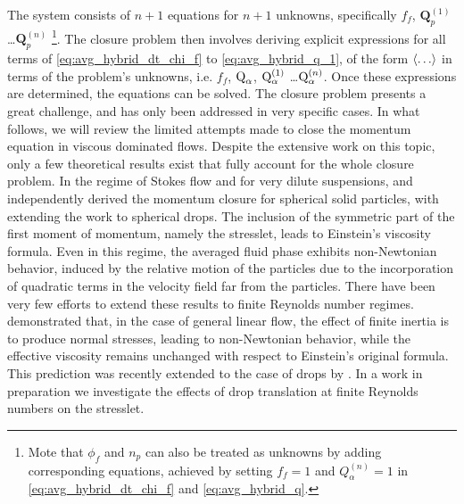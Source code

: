 The system consists of $n+1$ equations for $n+1$ unknowns, specifically $f_f$, $\textbf{Q}_p^{(1)}$\ldots$\textbf{Q}_p^{(n)}$ \footnote{Mote that $\phi_f$ and $n_p$ can also be treated as unknowns by adding corresponding equations, achieved by setting $f_f=1$ and $Q_\alpha^{(n)} =1$ in \ref{eq:avg_hybrid_dt_chi_f} and \ref{eq:avg_hybrid_q}.}.
 The closure problem then involves deriving explicit expressions for all terms of \ref{eq:avg_hybrid_dt_chi_f} to \ref{eq:avg_hybrid_q_1}, of the form $\left<\ldots\right>$ in terms of the problem's unknowns, i.e. 
 $f_f$, $\text Q_\alpha$, $\text Q_\alpha^{(1)}$ \ldots $ \text Q_\alpha^{(n)}$.  
 Once these expressions are determined, the equations can be solved. 
 The closure problem presents a great challenge, and has only been addressed in very specific cases. 
 In what follows, we will review the limited attempts made to close the momentum equation in viscous dominated flows. 
 Despite the extensive work on this topic, only a few theoretical results exist that fully account for the whole closure problem. 
 In the regime of Stokes flow and for very dilute suspensions, \citet{jackson1997locally} and \citet{zhang1997momentum} independently derived the momentum closure for spherical solid particles, with \citet{zhang1997momentum} extending the work to spherical drops. 
 The inclusion of the symmetric part of the first moment of momentum, namely the stresslet, leads to Einstein's viscosity formula. 
 Even in this regime, the averaged fluid phase exhibits non-Newtonian behavior, induced by the relative motion of the particles due to the incorporation of quadratic terms in the velocity field far from the particles.
 There have been very few efforts to extend these results to finite Reynolds number regimes. \citet{stone2001inertial} demonstrated that, in the case of general linear flow, the effect of finite inertia is to produce normal stresses, leading to non-Newtonian behavior, while the effective viscosity remains unchanged with respect to Einstein's original formula. 
 This prediction was recently extended to the case of drops by \citet{raja2010inertial}. 
 In a work in preparation we investigate the effects of drop translation at finite Reynolds numbers on the stresslet.


